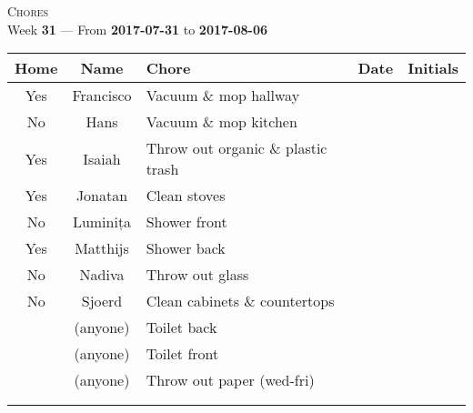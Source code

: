 \documentclass[12pt]{article}
\begin{document}
\begin{center}
  \large
  \textsc{Chores}\\
  Week \textbf{31} --- From \textbf{2017-07-31} to \textbf{2017-08-06}\\[0.5cm]
  \LARGE

  \begin{tabularx}{\textwidth}{|c|c|X|c|c|}
    \hline
    \textbf{Home} & \textbf{Name} & \centering\textbf{Chore} & \textbf{Date} & \textbf{Initials} \\ \hline
    \hline
       Yes &       Francisco & Vacuum \& mop hallway & \phantom{---------------} & \\[0.25cm] \hline 
        No &            Hans & Vacuum \& mop kitchen & \phantom{---------------} & \\[0.25cm] \hline 
       Yes &          Isaiah & Throw out organic \& plastic trash & \phantom{---------------} & \\[0.25cm] \hline 
       Yes &         Jonatan &         Clean stoves & \phantom{---------------} & \\[0.25cm] \hline 
        No &        Luminița &         Shower front & \phantom{---------------} & \\[0.25cm] \hline 
       Yes &        Matthijs &          Shower back & \phantom{---------------} & \\[0.25cm] \hline 
        No &          Nadiva &      Throw out glass & \phantom{---------------} & \\[0.25cm] \hline 
        No &          Sjoerd & Clean cabinets \& countertops & \phantom{---------------} & \\[0.25cm] \hline 
           &        (anyone) &          Toilet back & \phantom{---------------} & \\[0.15cm] \hline 
           &        (anyone) &         Toilet front & \phantom{---------------} & \\[0.15cm] \hline 
           &        (anyone) & Throw out paper (wed-fri) & \phantom{---------------} & \\[0.15cm] \hline 
       & & & \phantom{---------------} & \\[0.15cm] \hline 
       & & & \phantom{---------------} & \\[0.15cm] \hline 
    \end{tabularx}
\end{center}
\end{document}
